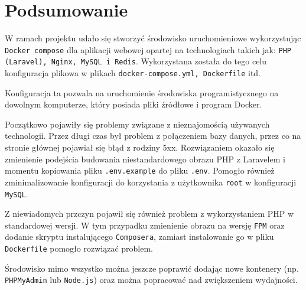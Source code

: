 \chapter{Podsumowanie}
W ramach projektu udało się stworzyć środowisko uruchomieniowe wykorzystując \verb|Docker compose| dla aplikacji webowej opartej na technologiach takich jak: \verb|PHP (Laravel), Nginx, MySQL i Redis|. Wykorzystana została do tego celu konfiguracja plikowa w plikach \verb|docker-compose.yml, Dockerfile| itd.

Konfiguracja ta pozwala na uruchomienie środowiska programistycznego na dowolnym komputerze, który posiada pliki źródłowe i program Docker.

Początkowo pojawiły się problemy związane z nieznajomością używanych technologii. Przez długi czas był problem z połączeniem bazy danych, przez co na stronie głównej pojawiał się błąd z rodziny 5xx. Rozwiązaniem okazało się zmienienie podejścia budowania niestandardowego obrazu PHP z Laravelem i momentu kopiowania pliku \verb|.env.example| do pliku \verb|.env|. Pomogło również zminimalizowanie konfiguracji do korzystania z użytkownika \verb|root| w konfiguracji \verb|MySQL|.

Z niewiadomych przczyn pojawił się również problem z wykorzystaniem PHP w standardowej wersji. W tym przypadku zmienienie obrazu na wersję \verb|FPM| oraz dodanie skryptu instalującego \verb|Composera|, zamiast instalowanie go w pliku \verb|Dockerfile| pomogło rozwiązać problem.

Środowisko mimo wszystko można jeszcze poprawić dodając nowe kontenery (np. \verb|PHPMyAdmin| lub \verb|Node.js|) oraz można popracować nad zwiększeniem wydajności.
